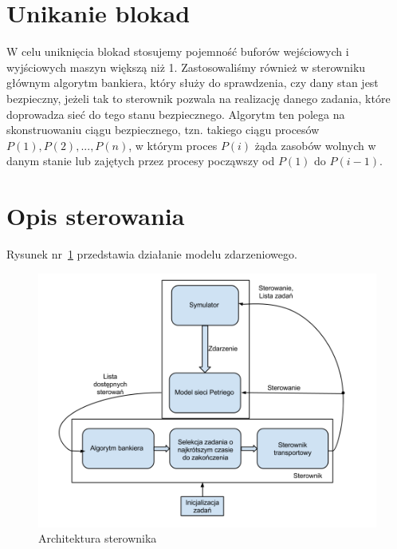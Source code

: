 \documentclass[10pt, a4paper]{article}
\begin{document}
%
%
%

\section{Unikanie blokad}
W celu uniknięcia blokad stosujemy pojemność buforów wejściowych i wyjściowych maszyn większą niż 1. Zastosowaliśmy również w sterowniku głównym algorytm bankiera, który służy do sprawdzenia, czy dany stan jest bezpieczny, jeżeli tak to sterownik pozwala na realizację danego zadania, które doprowadza sieć do tego stanu bezpiecznego. Algorytm ten polega na skonstruowaniu ciągu bezpiecznego, tzn. takiego ciągu procesów $P(1),P(2),...,P(n)$, w którym proces $P(i)$ żąda zasobów wolnych w danym stanie lub zajętych przez procesy począwszy od $P(1)$ do $P(i-1)$. 



\section{Opis sterowania}
Rysunek nr~\ref{fig:alg} przedstawia działanie modelu zdarzeniowego.
 \begin{figure}[H]
  \begin{center}
    \includegraphics[width=1\textwidth]{./obrazki/alg.png}
    \caption{Architektura sterownika}
    \label{fig:alg}
  \end{center}
 \end{figure}
\end{document}
